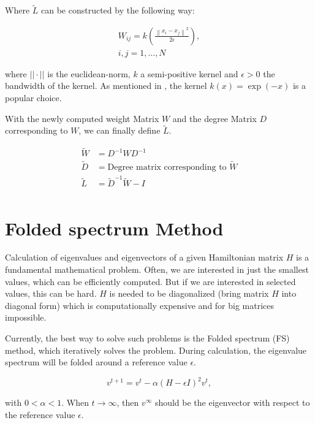 Where $\tilde{L}$ can be constructed by the following way:

\begin{equation}
    \begin{aligned}
        W_{ij} = k \left ( \frac{\left \| x_i - x_j \right \|^2}{2 \epsilon}  \right ), \\
        i, j = 1, \dots, N
    \end{aligned}
\end{equation}

where $||\cdot ||$ is the euclidean-norm, $k$ a semi-positive kernel 
and  $\epsilon > 0$ the bandwidth of the kernel. As mentioned in \cite{LaplaceRandomProjections},
the kernel $k(x) = \exp (-x)$ is a popular choice.

With the newly computed weight Matrix $W$ and the degree Matrix $D$ corresponding to $W$, we can finally 
define $\tilde{L}$.

\begin{equation}
    \begin{aligned}
        \tilde{W} &= D^{-1} W D^{-1} \\
        \tilde{D} &= \text{Degree matrix corresponding to } \tilde{W} \\
        \tilde{L} &= \tilde{D}^{-1} \tilde{W} - I \\
    \end{aligned}
\end{equation}


\section{Folded spectrum Method}
Calculation of eigenvalues and eigenvectors of a given Hamiltonian matrix $H$ 
is a fundamental mathematical problem. Often, we are interested in just the smallest 
values, which can be efficiently computed. But if we are interested in selected values,
this can be hard. $H$ is needed to be diagonalized (bring matrix $H$ into diagonal form) 
which is computationally expensive and for big matrices impossible.

Currently, the best way to solve such problems is the Folded spectrum (FS) \cite{foldedSpectrumMethod} method,
which iteratively solves the problem. During calculation, the eigenvalue spectrum will be folded around a reference 
value $\epsilon$.

\begin{equation}
    v^{t+1} = v^t - \alpha (H - \epsilon I )^2 v^t ,
\end{equation}

with $0 < \alpha < 1$. When $t \rightarrow \infty$, then $v^{\infty}$ should be the 
eigenvector with respect to the reference value $\epsilon$.


